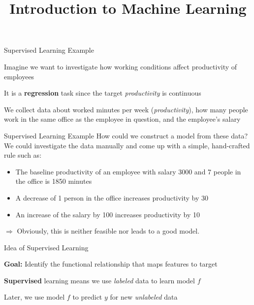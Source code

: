 \documentclass[11pt,compress,t,notes=noshow, xcolor=table]{beamer}
\title{Introduction to Machine Learning}
\begin{document}


\begin{framei}{Supervised Learning Example}
\item Imagine we want to investigate how working conditions affect productivity of employees
\item It is a \textbf{regression} task since the target \emph{productivity} is continuous
\item We collect data about worked minutes per week (\emph{productivity}), how many people work in the same office as the employee in question, and the employee's salary
\vfill
{} %
\end{framei}


\begin{frame2}{Supervised Learning Example}
How could we construct a model from these data?\\
\spacer
We could investigate the data manually and come up with a simple, hand-crafted rule such as:
\spacer
\begin{itemize}
\item The baseline productivity of an employee with salary 3000 and 7 people in the office is 1850 minutes
\item A decrease of 1 person in the office increases productivity by 30
\item An increase of the salary by 100 increases productivity by 10
\end{itemize}
\vfill
$\Rightarrow$ Obviously, this is neither feasible nor leads to a good model.
\end{frame2}


\begin{framei}[sep=L]{Idea of Supervised Learning}
\item \textbf{Goal:} Identify the functional relationship that maps features to target
\item \textbf{Supervised} learning means we use \emph{labeled} data to learn model $f$
\item Later, we use model $f$ to predict $y$ for new \emph{unlabeled} data
\end{framei}
\end{document}
